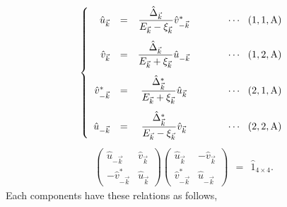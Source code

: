 \documentclass[uplatex,a4j,12pt,dvipdfmx]{jsarticle}
\begin{document}
\begin{eqnarray}
	\left\{
	\begin{array}{rccl}
		\hat{u}_{\vec{k}}
		 & =                                      &
		\dfrac{ \hat{\Delta}_{\vec{k}} }{ E_{\vec{k}} - \xi_{\vec{k}} }
		\hat{v}_{-\vec{k}}^{*}
		 & \hspace{10mm} \cdots \ \ (1,1,{\rm A})
		\\[5mm]
		\hat{v}_{\vec{k}}
		 & =                                      &
		\dfrac{ \hat{\Delta}_{\vec{k}} }{ E_{\vec{k}} + \xi_{\vec{k}} } \hat{u}_{-\vec{k}}
		 & \hspace{10mm} \cdots \ \ (1,2,{\rm A})
		\\[5mm]
		\hat{v}_{-\vec{k}}^{*}
		 & =                                      &
		\dfrac{ \hat{\Delta}^{*}_{\vec{k}} }{ E_{\vec{k}} + \xi_{\vec{k}} } \hat{u}_{\vec{k}}
		 & \hspace{10mm} \cdots \ \ (2,1,{\rm A})
		\\[5mm]
		\hat{u}_{-\vec{k}}
		 & =                                      &
		\dfrac{ \hat{\Delta}^{*}_{\vec{k}} }{ E_{\vec{k}} - \xi_{\vec{k}} } \hat{v}_{\vec{k}}
		 & \hspace{10mm} \cdots \ \ (2,2,{\rm A})
	\end{array}
	\right.
\end{eqnarray}
%
	\begin{eqnarray}
		\left(
		\begin{array}{cc}
				\hat{u}_{-\vec{k}}        & \hat{v}_{\vec{k}} \\[2mm]
				- \hat{v}_{- \vec{k}}^{*} & \hat{u}_{\vec{k}}
			\end{array}
		\right)
		\!\!\!
		\left(
		\begin{array}{cc}
				\hat{u}_{\vec{k}}       & - \hat{v}_{\vec{k}} \\[2mm]
				\hat{v}_{- \vec{k}}^{*} & \hat{u}_{-\vec{k}}
			\end{array}
		\right)
		\ \ = \ \
		\hat{1}_{4 \times 4}
		.
	\end{eqnarray}
	Each components have these relations as follows,
\end{document}
